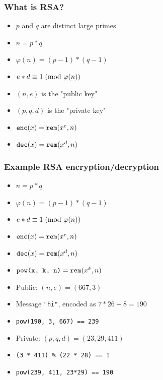 \documentclass[aspectratio=169]{beamer}
\begin{document}
\begin{frame}[fragile]
\frametitle{What is RSA?}
\begin{itemize}
\item $p$ and $q$ are distinct large primes
\item $n = p * q$
\item $\varphi(n) = (p-1)*(q-1)$
\item $e * d \equiv 1\hspace{1mm}(\text{mod } \varphi(n))$
\item $(n, e)$ is the "public key"
\item $(p, q, d)$ is the "private key"
\item $\verb|enc|(x) = \verb|rem|(x^e, n)$
\item $\verb|dec|(x) = \verb|rem|(x^d, n)$
\end{itemize}
\end{frame}


\begin{frame}[fragile]
\frametitle{Example RSA encryption/decryption}
\begin{minipage}{0.3\textwidth}
\begin{itemize}
\item $n = p * q$
\item $\varphi(n) = (p-1)*(q-1)$
\item $e * d \equiv 1\hspace{1mm}(\text{mod } \varphi(n))$
\item $\verb|enc|(x) = \verb|rem|(x^e, n)$
\item $\verb|dec|(x) = \verb|rem|(x^d, n)$
\item $\verb|pow(x, k, n)| = \verb|rem|(x^k, n)$
\end{itemize}
\end{minipage}
\begin{minipage}{0.6\textwidth}
\begin{itemize}
\item<1-> Public: $(n, e) = (667, 3)$
\item<1-> Message \verb|"hi"|, encoded as $7*26+8 = 190$
\item<1-> \verb|pow(190, 3, 667) == 239|
\item<2> Private: $(p, q, d) = (23, 29, 411)$
\item<2> \verb|(3 * 411) % (22 * 28) == 1|
\item<2> \verb|pow(239, 411, 23*29) == 190|
\end{itemize}
\end{minipage}
\end{frame}
\end{document}
